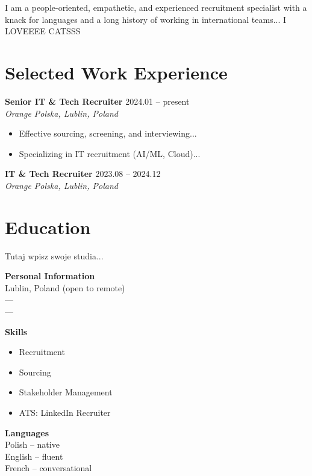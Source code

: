 \documentclass[12pt,a4paper]{article}
\begin{document}
\begin{minipage}[t]{0.59\textwidth} %
    \color{textdark}
    \small
    I am a people-oriented, empathetic, and experienced recruitment specialist with a knack for languages and a long history of working in international teams... I LOVEEEE CATSSS 
    
    \section*{Selected Work Experience}
    
    \textbf{Senior IT \& Tech Recruiter} \hfill 2024.01 -- present \\
    \textit{Orange Polska, Lublin, Poland}
    \begin{itemize}[leftmargin=*, noitemsep, topsep=2pt]
        \item Effective sourcing, screening, and interviewing...
        \item Specializing in IT recruitment (AI/ML, Cloud)...
    \end{itemize}

    \vspace{0.3cm}
    \textbf{IT \& Tech Recruiter} \hfill 2023.08 -- 2024.12 \\
    \textit{Orange Polska, Lublin, Poland}
    
    \section*{Education}
    Tutaj wpisz swoje studia...
\end{minipage}
\hfill
\begin{minipage}[t]{0.25\textwidth} %
    \vspace{0cm} %
    \color{textdark}
    
    \centering
    
    \vspace{0.5cm}
    \flushleft
    \small
    \textbf{Personal Information} \\
    Lublin, Poland (open to remote) \\
    --- \\
    ---
    
    \vspace{0.5cm}
    \textbf{Skills}
    \begin{itemize}[leftmargin=10pt, noitemsep]
        \item Recruitment
        \item Sourcing
        \item Stakeholder Management
        \item ATS: LinkedIn Recruiter
    \end{itemize}
    
    \vspace{0.5cm}
    \textbf{Languages} \\
    Polish -- native \\
    English -- fluent \\
    French -- conversational
\end{minipage}
\end{document}
